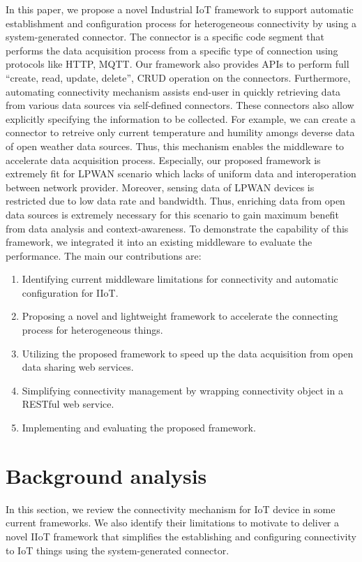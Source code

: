 In this paper, we propose a novel Industrial IoT framework to support automatic establishment and configuration process for heterogeneous connectivity by using a system-generated connector. The connector is a specific code segment that performs the data acquisition process from a specific type of connection using protocols like HTTP, MQTT. Our framework also provides APIs to perform full “create, read, update, delete”, CRUD operation on the connectors. Furthermore, automating connectivity mechanism assists end-user in quickly retrieving data from various data sources via self-defined connectors. These connectors also allow explicitly specifying the information to be collected. For example, we can create a connector to retreive only current temperature and humility amongs deverse data of open weather data sources. Thus, this mechanism enables the middleware to accelerate data acquisition process. Especially, our proposed framework is extremely fit for LPWAN scenario which lacks of uniform data and interoperation between network provider. Moreover, sensing data of LPWAN devices is restricted due to low data rate and bandwidth. Thus, enriching data from open data sources is extremely necessary for this scenario to gain maximum benefit from data analysis and context-awareness. To demonstrate the capability of this framework, we integrated it into an existing middleware to evaluate the performance. The main our contributions are:
\begin{enumerate}
    \item Identifying current middleware limitations for connectivity and automatic configuration for IIoT.
    \item Proposing a novel and lightweight framework to accelerate the connecting process for heterogeneous things.
    \item Utilizing the proposed framework to speed up the data acquisition from open data sharing web services.
    \item Simplifying connectivity management by wrapping connectivity object in a RESTful web service.
    \item Implementing and evaluating the proposed framework.
\end{enumerate}

\section{Background analysis}
In this section, we review the connectivity mechanism for IoT device in some current frameworks. We also identify their limitations to motivate to deliver a novel IIoT framework that simplifies the establishing and configuring connectivity to IoT things using the system-generated connector.
